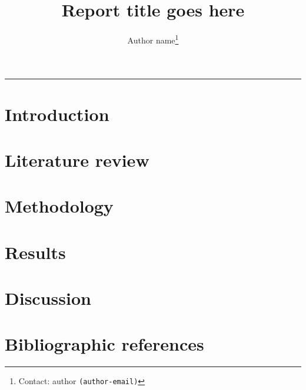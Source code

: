 \documentclass[12pt]{article}
\title{\vspace{-0.75in}\large{Report title goes here}}
\author[]{Author name\footnote{Contact: author  \texttt{(author-email)}}}
\affil[]{Author affiliation}
\numberwithin{equation}{section}
\theoremstyle{definition}
\begin{document}
\date{}
\maketitle
\vspace{-0.5cm} \hrule


\setcounter{page}{1}
\section{Introduction}


\section{Literature review}



\section{Methodology}



\section{Results}



\section{Discussion}




\section*{Bibliographic references}
\end{document}
